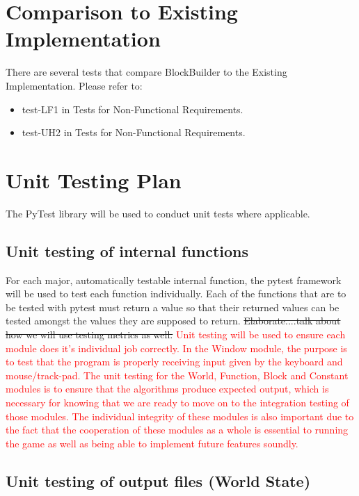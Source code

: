 \documentclass[12pt, titlepage]{article}
\begin{document}
	
\section{Comparison to Existing Implementation}	

There are several tests that compare BlockBuilder to the Existing Implementation. Please refer to:

\begin{itemize}
    \item test-LF1 in Tests for Non-Functional Requirements.
    \item test-UH2 in Tests for Non-Functional Requirements.
\end{itemize}
				
\section{Unit Testing Plan}

The PyTest library will be used to conduct unit tests where applicable.
		
\subsection{Unit testing of internal functions}

For each major, automatically testable internal function, the pytest framework will be used to test each function individually. Each of the functions that are to be tested with pytest must return a value so that their returned values can be tested amongst the values they are supposed to return. 
\sout{Elaborate....talk about how we will use testing metrics as well.}
\textcolor{red}{Unit testing will be used to ensure each module does it's individual job correctly. In the Window module, the purpose is to test that the program is properly receiving input given by the keyboard and mouse/track-pad. The unit testing for the World, Function, Block and Constant modules is to ensure that the algorithms produce expected output, which is necessary for knowing that we are ready to move on to the integration testing of those modules. The individual integrity of these modules is also important due to the fact that the cooperation of these modules as a whole is essential to running the game as well as being able to implement future features soundly.}
\subsection{Unit testing of output files (World State)}
\end{document}
